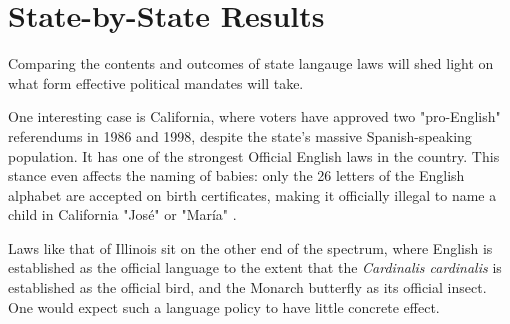 \documentclass{article}
\begin{document}
\section*{State-by-State Results}

Comparing the contents and outcomes of state langauge laws will shed light on
what form effective political mandates will take.

One interesting case is California, where voters have approved two "pro-English"
referendums in 1986 and 1998, despite the state's massive Spanish-speaking
population. It has one of the strongest Official English laws in the country.
This stance even affects the naming of babies: only the 26 letters of the
English alphabet are accepted on birth certificates, making it officially
illegal to name a child in California "José" or "María" \textcite{Larson11}.

Laws like that of Illinois sit on the other end of the spectrum, where English
is established as the official language to the extent that the
\textit{Cardinalis cardinalis} is established as the official bird, and the
Monarch butterfly as its official insect. One would expect such a language
policy to have little concrete effect.

\printbibliography
\end{document}
